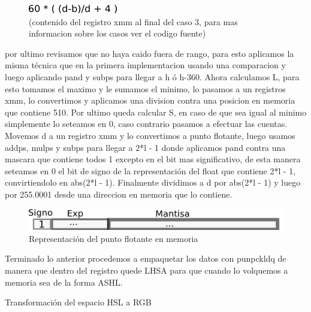 \documentclass[a4paper]{article}
\begin{document}
\begin{figure}[H]
\centering
\includegraphics[scale=0.8]{imagenes/resultH.png}
\caption{(contenido del registro xmm al final del caso 3, para mas informacion sobre los casos ver el codigo fuente)}
\label{lshValue}
\end{figure}

 por ultimo revisamos que no haya caido fuera de rango, para esto aplicamos la misma técnica que en la primera implementacion usando una comparacion y luego aplicando pand y subps para llegar a h ó h-360.
 \newline
Ahora calculamos L, para esto tomamos el maximo y le sumamos el minimo, lo pasamos a un registros xmm, lo convertimos y aplicamos una division contra una posicion en memoria que contiene 510.
\newline
Por ultimo queda calcular S, en caso de que sea igual al minimo simplemente lo seteamos en 0, caso contrario pasamos a efectuar las cuentas. Movemos d a un registro xmm y lo convertimos a punto flotante, luego usamos addps, mulps y subps para llegar a 2*l - 1 donde aplicamos pand contra una mascara que contiene todos 1 excepto en el bit mas significativo, de esta manera seteamos en 0 el bit de signo de la representación del float que contiene 2*l - 1, convirtiendolo en abs(2*l - 1). Finalmente dividimos a d por abs(2*l - 1) y luego por 255.0001 desde una direccion en memoria que lo contiene.
\newline

\begin{figure}[H]
\centering
\includegraphics[scale=0.8]{imagenes/representacionfloat.png}
\caption{Representación del punto flotante en memoria}
\label{lshValue2}
\end{figure}

Terminado lo anterior procedemos a empaquetar los datos con punpckldq de manera que dentro del registro quede LHSA para que cuando lo volquemos a memoria sea de la forma ASHL.
\newline\newline

Transformación del espacio HSL a RGB
\newline\newline
\end{document}
